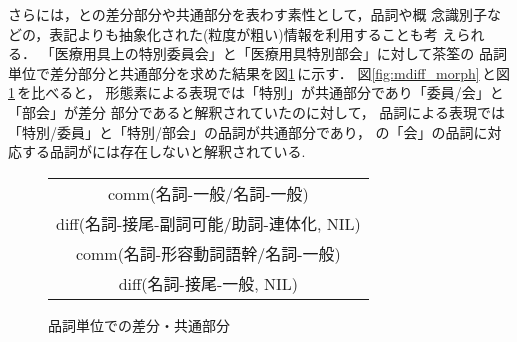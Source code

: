 さらには，{\CT}と{\NT}の差分部分や共通部分を表わす素性として，品詞や概
念識別子などの，表記よりも抽象化された(粒度が粗い)情報を利用することも考
えられる．
{\CT}「医療用具上の特別委員会」と{\NT}「医療用具特別部会」に対して茶筌の
品詞単位で差分部分と共通部分を求めた結果を図\ref{fig:mdiff_pos}\,に示す．
図\ref{fig:mdiff_morph}\,と図\ref{fig:mdiff_pos}\,を比べると，
形態素による表現では「特別」が共通部分であり「委員/会」と「部会」が差分
部分であると解釈されていたのに対して，
品詞による表現では「特別/委員」と「特別/部会」の品詞が共通部分であり，
{\CT}の「会」の品詞に対応する品詞が{\NT}には存在しないと解釈されている.
\begin{figure}[htbp]
\begin{center}
\begin{tabular}{|c|}\hline
comm(名詞-一般/名詞-一般) \\
diff(名詞-接尾-副詞可能/助詞-連体化, NIL) \\
comm(名詞-形容動詞語幹/名詞-一般) \\
diff(名詞-接尾-一般, NIL) \\\hline
\end{tabular}
\end{center}
\caption{品詞単位での差分・共通部分}
\label{fig:mdiff_pos}
\end{figure}


